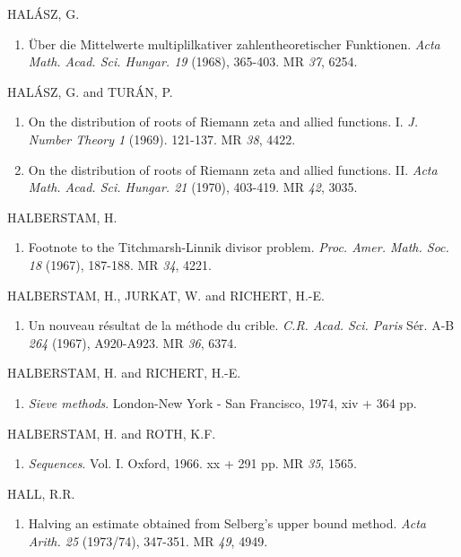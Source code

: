 \begin{thebibliography}{99}
 HAL\'ASZ, G.
\begin{enumerate}
\item \"Uber die Mittelwerte multiplilkativer zahlentheoretischer
  Funktionen. \textit{Acta
    Math. Acad. Sci. Hungar. 19} (1968), 365-403. MR {\em 37}, 6254. 
\end{enumerate}

 HAL\'ASZ, G. and TUR\'AN, P.
\begin{enumerate}
\item On the distribution of roots of Riemann zeta and allied
  functions. I. \textit{J. Number Theory 1} (1969). 121-137. MR
  {\em 38}, 4422. 

\item On the distribution of roots of Riemann zeta and allied
  functions. II. \textit{Acta
    Math. Acad. Sci. Hungar. 21} (1970), 403-419. MR {\em 42}, 3035. 
\end{enumerate}

 HALBERSTAM, H.
\begin{enumerate}
\item Footnote to the Titchmarsh-Linnik divisor
  problem. \textit{Proc. Amer. Math. Soc. 18} (1967), 187-188. MR {\em
    34}, 4221.
\end{enumerate}

 HALBERSTAM, H., JURKAT, W. and RICHERT, H.-E.
\begin{enumerate}
\item Un nouveau r\'esultat de la m\'ethode du
  crible. \textit{C.R. Acad. Sci. Paris} S\'er. A-B {\em 264} (1967),
  A920-A923. MR {\em 36}, 6374. 
\end{enumerate}

 HALBERSTAM, H. and RICHERT, H.-E.
\begin{enumerate}
\item \textit{Sieve methods}. London-New York - San Francisco, 1974,
  xiv + 364 pp.
\end{enumerate}

 HALBERSTAM, H. and ROTH, K.F.
\begin{enumerate}
\item \textit{Sequences}. Vol. I. Oxford, 1966.  xx + 291 pp. MR {\em
  35}, 1565.
\end{enumerate}

 HALL, R.R.
\begin{enumerate}
\item Halving an estimate obtained from Selberg's upper bound
  method. \textit{Acta Arith. 25} (1973/74), 347-351. MR {\em 49}, 4949.
\end{enumerate}


\end{thebibliography}
